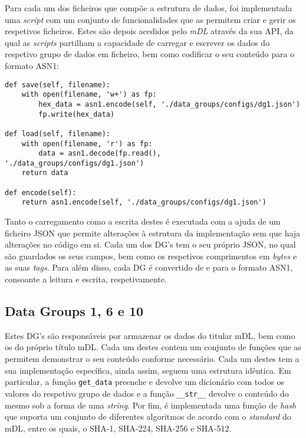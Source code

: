 
Para cada um dos ficheiros que compõe a estrutura de dados, foi implementada uma \textit{script} com um conjunto de funcionalidades que as permitem criar e gerir os respetivos ficheiros. Estes são depois acedidos pelo \textit{mDL} através da sua API, da qual as \textit{scripts} partilham a capacidade de carregar e escrever os dados do respetivo grupo de dados em ficheiro, bem como codificar o seu conteúdo	para o formato ASN1:

\begin{verbatim}
def save(self, filename):
    with open(filename, 'w+') as fp:
        hex_data = asn1.encode(self, './data_groups/configs/dg1.json')
        fp.write(hex_data)

def load(self, filename):
    with open(filename, 'r') as fp:
        data = asn1.decode(fp.read(), './data_groups/configs/dg1.json')
    return data

def encode(self):
    return asn1.encode(self, './data_groups/configs/dg1.json')
\end{verbatim}

Tanto o carregamento como a escrita destes é executada com a ajuda de um ficheiro JSON que permite alterações à estrutura da implementação sem que haja alterações no código em si. Cada um dos DG's tem o seu próprio JSON, no qual são guardados os seus campos, bem como os respetivos comprimentos em \textit{bytes} e as suas \textit{tags}. Para além disso, cada DG é convertido de e para o formato ASN1, consoante a leitura e escrita, respetivamente.

\subsection{Data Groups 1, 6 e 10}

Estes DG's são responsáveis por armazenar os dados do titular mDL, bem como os do próprio título mDL. Cada um destes contem um conjunto de funções que as permitem demonstrar o seu conteúdo conforme necessário. Cada um destes tem a sua implementação específica, ainda assim, seguem uma estrutura idêntica. Em particular, a função \texttt{get\_data} preenche e devolve um dicionário com todos os valores do respetivo grupo de dados e a função \texttt{\_\_str\_\_} devolve o conteúdo do mesmo sob a forma de uma \textit{string}. Por fim, é implementada uma função de \textit{hash} que suporta um conjunto de diferentes algoritmos de acordo com o \textit{standard} do mDL, entre os quais, o SHA-1, SHA-224, SHA-256 e SHA-512.



